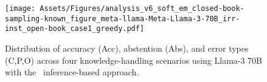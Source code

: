 \begin{figure}[t]
    \centering
    \texttt{[image: Assets/Figures/analysis\_v6\_soft\_em\_closed-book-sampling-known\_figure\_meta-llama-Meta-Llama-3-70B\_irr-inst\_open-book\_case1\_greedy.pdf]} 
    \caption{Distribution of accuracy (Acc), abstention (Abs), and error types (C,P,O) across four knowledge-handling scenarios using Llama-3 70B with the \absinst\ inference-based approach.}
    \label{figure:eval_v6_models_irr-inst}
\end{figure}

